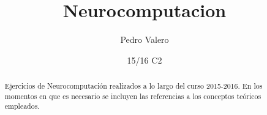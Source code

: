 \documentclass[nochap,palatino]{apuntes}
\title{Neurocomputacion}
\author{Pedro Valero}
\date{15/16 C2}
\begin{document}
\pagestyle{plain}

\begin{abstract}
Ejercicios de Neurocomputación realizados a lo largo del curso 2015-2016. En los momentos en que es necesario se incluyen las referencias a los conceptos teóricos empleados.
\end{abstract}

\maketitle

\tableofcontents
\newpage


\printindex
\end{document}
